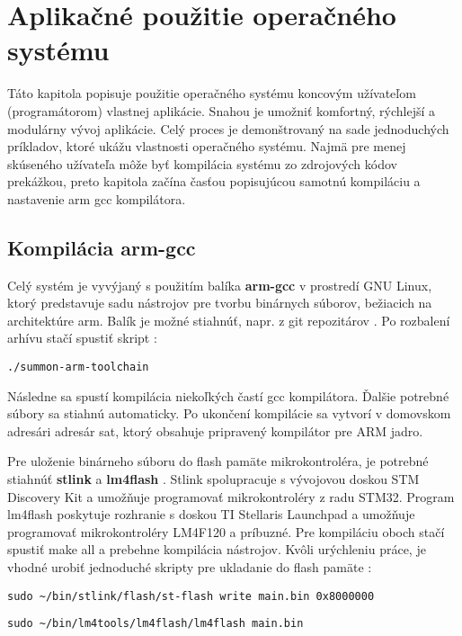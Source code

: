 \chapter{Aplikačné použitie operačného systému}

Táto kapitola popisuje použitie operačného systému koncovým užívateľom (programátorom) vlastnej aplikácie. Snahou je umožniť komfortný, rýchlejší a modulárny vývoj aplikácie. Celý proces je demonštrovaný na sade jednoduchých príkladov, ktoré ukážu vlastnosti operačného systému. Najmä pre menej skúseného užívateľa môže byť kompilácia systému zo zdrojových kódov prekážkou, preto kapitola začína časťou popisujúcou samotnú kompiláciu a nastavenie arm gcc kompilátora.

\section{Kompilácia arm-gcc}

Celý systém je vyvýjaný s použitím balíka \textbf{arm-gcc} v prostredí GNU Linux, ktorý predstavuje sadu nástrojov pre tvorbu binárnych súborov, bežiacich na architektúre arm. Balík je možné stiahnúť, napr. z git repozitárov \cite{arm_summom_git}. Po rozbalení arhívu stačí spustiť skript : 
{\small
\begin{verbatim}
./summon-arm-toolchain
\end{verbatim}
}


Následne sa spustí kompilácia niekoľkých častí gcc kompilátora. Ďalšie potrebné súbory sa stiahnú automaticky. Po ukončení kompilácie sa vytvorí v domovskom adresári adresár sat, ktorý obsahuje pripravený kompilátor pre ARM jadro.
 
Pre uloženie binárneho súboru do flash pamäte mikrokontroléra, je potrebné stiahnúť \textbf{stlink} \cite{stlink} a \textbf{lm4flash} \cite{lm4_flash}. Stlink spolupracuje s vývojovou doskou STM Discovery Kit a umožňuje programovať mikrokontroléry z radu STM32. Program lm4flash poskytuje rozhranie s doskou TI Stellaris Launchpad a umožňuje programovať mikrokontroléry LM4F120 a príbuzné. Pre kompiláciu oboch stačí spustiť make all a prebehne kompilácia nástrojov. Kvôli urýchleniu práce, je vhodné urobiť jednoduché skripty pre ukladanie do flash pamäte :

{\small
\begin{verbatim}
sudo ~/bin/stlink/flash/st-flash write main.bin 0x8000000
\end{verbatim}
}

{\small
\begin{verbatim}
sudo ~/bin/lm4tools/lm4flash/lm4flash main.bin
\end{verbatim}
}

